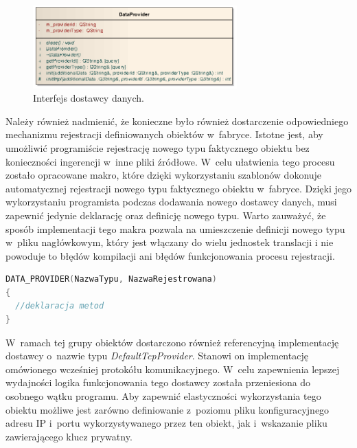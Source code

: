 \begin{figure}[ht]
  \centering
  \caption{Interfejs dostawcy danych.}
  \label{fig:DataProvider}
\includegraphics[width=0.7\textwidth]{img/provider.png}
\end{figure}

Należy również nadmienić, że konieczne było również dostarczenie
odpowiedniego mechanizmu rejestracji definiowanych obiektów
w~fabryce. Istotne jest, aby umożliwić programiście rejestrację nowego
typu faktycznego obiektu bez konieczności ingerencji w~inne pliki
źródłowe. W~celu ułatwienia tego procesu zostało opracowane makro,
które dzięki wykorzystaniu szablonów dokonuje automatycznej
rejestracji nowego typu faktycznego obiektu w~fabryce. Dzięki jego
wykorzystaniu programista podczas dodawania nowego dostawcy danych,
musi zapewnić jedynie deklarację oraz definicję nowego typu. Warto
zauważyć, że sposób implementacji tego makra pozwala na umieszczenie
definicji nowego typu w~pliku nagłówkowym, który jest włączany do
wielu jednostek translacji i nie powoduje to błędów kompilacji ani
błędów funkcjonowania procesu rejestracji.

\vspace{0.5cm}
\begin{minipage}{\textwidth}
\begin{lstlisting}[language=c++, caption=Definicja dostawcy danych, linewidth=10cm]
DATA_PROVIDER(NazwaTypu, NazwaRejestrowana)
{
  //deklaracja metod
}
\end{lstlisting}
\end{minipage}
\vspace{0.5cm}

W~ramach tej grupy obiektów dostarczono również referencyjną
implementację dostawcy o~nazwie typu {\em DefaultTcpProvider}. Stanowi
on implementację omówionego wcześniej protokółu
komunikacyjnego. W~celu zapewnienia lepszej wydajności logika
funkcjonowania tego dostawcy została przeniesiona do osobnego wątku
programu. Aby zapewnić elastyczności wykorzystania tego obiektu
możliwe jest zarówno definiowanie z~poziomu pliku konfiguracyjnego
adresu IP i~portu wykorzystywanego przez ten obiekt, jak i~wskazanie
pliku zawierającego klucz prywatny.

